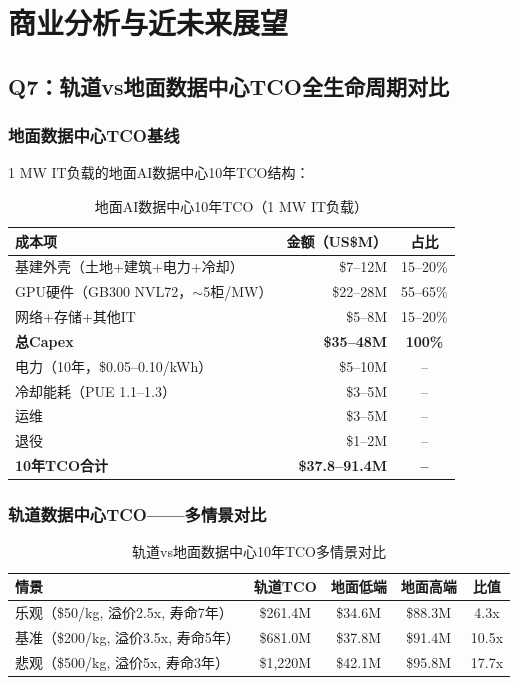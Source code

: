 
\section{商业分析与近未来展望}

\subsection{Q7：轨道vs地面数据中心TCO全生命周期对比}

\subsubsection{地面数据中心TCO基线}

1 MW IT负载的地面AI数据中心10年TCO结构\cite{cloudzero2026gpu,cgranier2025capex,spheron2026gpu}：

\begin{table}[H]
\centering
\caption{地面AI数据中心10年TCO（1 MW IT负载）}
\label{tab:ground_tco}
\small
\begin{tabular}{lrc}
\toprule
\textbf{成本项} & \textbf{金额（US\$M）} & \textbf{占比} \\
\midrule
基建外壳（土地+建筑+电力+冷却） & \$7--12M & 15--20\% \\
GPU硬件（GB300 NVL72，$\sim$5柜/MW） & \$22--28M & 55--65\% \\
网络+存储+其他IT & \$5--8M & 15--20\% \\
\rowcolor{gray!10} \textbf{总Capex} & \textbf{\$35--48M} & \textbf{100\%} \\
电力（10年，\$0.05--0.10/kWh） & \$5--10M & -- \\
冷却能耗（PUE 1.1--1.3） & \$3--5M & -- \\
运维 & \$3--5M & -- \\
退役 & \$1--2M & -- \\
\rowcolor{gray!10} \textbf{10年TCO合计} & \textbf{\$37.8--91.4M} & \textbf{--} \\
\bottomrule
\end{tabular}
\end{table}

\subsubsection{轨道数据中心TCO——多情景对比}

\begin{table}[H]
\centering
\caption{轨道vs地面数据中心10年TCO多情景对比}
\label{tab:orbital_tco}
\begin{tabularx}{\textwidth}{lcccc}
\toprule
\textbf{情景} & \textbf{轨道TCO} & \textbf{地面低端} & \textbf{地面高端} & \textbf{比值} \\
\midrule
乐观（\$50/kg, 溢价2.5x, 寿命7年） & \$261.4M & \$34.6M & \$88.3M & 4.3x \\
基准（\$200/kg, 溢价3.5x, 寿命5年） & \$681.0M & \$37.8M & \$91.4M & 10.5x \\
悲观（\$500/kg, 溢价5x, 寿命3年） & \$1,220M & \$42.1M & \$95.8M & 17.7x \\
\bottomrule
\end{tabularx}
\end{table}

